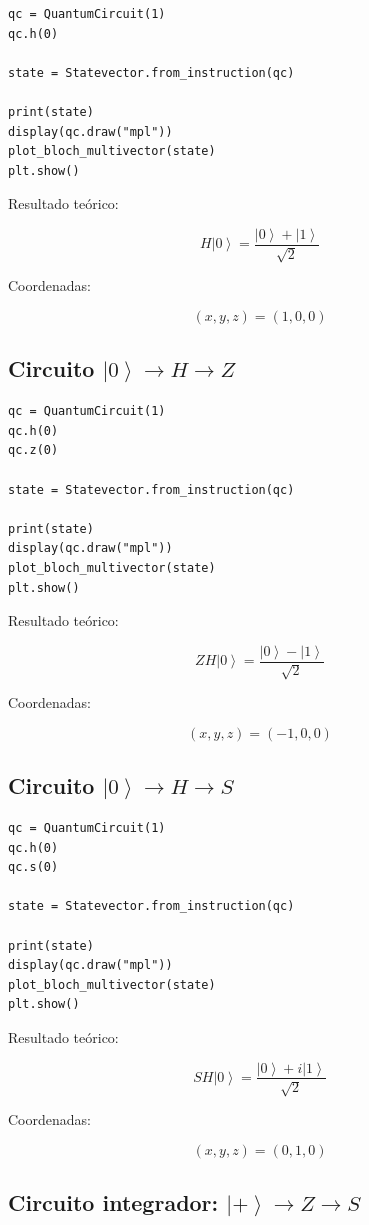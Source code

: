 \documentclass[12pt,a4paper]{article}
\newcommand{\ket}[1]{\left|#1\right\rangle}
\begin{document}
\begin{lstlisting}
qc = QuantumCircuit(1)
qc.h(0)

state = Statevector.from_instruction(qc)

print(state)
display(qc.draw("mpl"))
plot_bloch_multivector(state)
plt.show()
\end{lstlisting}

Resultado teórico:

\[
H\ket{0}=\frac{\ket{0}+\ket{1}}{\sqrt{2}}
\]

Coordenadas:

\[
(x,y,z)=(1,0,0)
\]

\subsection{Circuito \texorpdfstring{$\ket{0}\rightarrow H\rightarrow Z$}{ket 0 H Z}}

\begin{lstlisting}
qc = QuantumCircuit(1)
qc.h(0)
qc.z(0)

state = Statevector.from_instruction(qc)

print(state)
display(qc.draw("mpl"))
plot_bloch_multivector(state)
plt.show()
\end{lstlisting}

Resultado teórico:

\[
ZH\ket{0}=
\frac{\ket{0}-\ket{1}}{\sqrt{2}}
\]

Coordenadas:

\[
(x,y,z)=(-1,0,0)
\]

\subsection{Circuito \texorpdfstring{$\ket{0}\rightarrow H\rightarrow S$}{ket 0 H S}}

\begin{lstlisting}
qc = QuantumCircuit(1)
qc.h(0)
qc.s(0)

state = Statevector.from_instruction(qc)

print(state)
display(qc.draw("mpl"))
plot_bloch_multivector(state)
plt.show()
\end{lstlisting}

Resultado teórico:

\[
SH\ket{0}=
\frac{\ket{0}+i\ket{1}}{\sqrt{2}}
\]

Coordenadas:

\[
(x,y,z)=(0,1,0)
\]

\subsection{Circuito integrador: \texorpdfstring{$\ket{+}\rightarrow Z\rightarrow S$}{ket plus Z S}}
\end{document}

